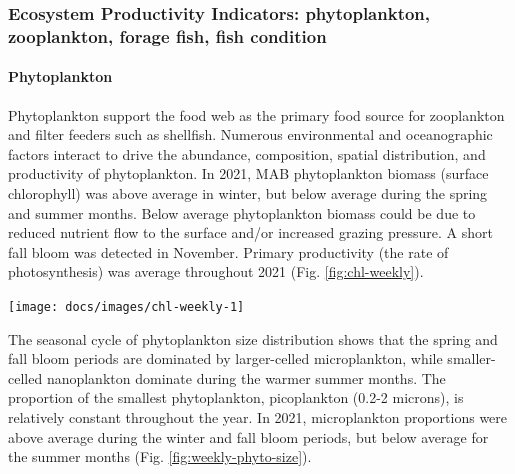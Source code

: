\documentclass[
  10pt,
]{article}
\let\origfigure\figure
\let\endorigfigure\endfigure
\renewenvironment{figure}[1][2] {
    \expandafter\origfigure\expandafter[H]
} {
    \endorigfigure
}
\begin{document}
\hypertarget{ecosystem-productivity-indicators-phytoplankton-zooplankton-forage-fish-fish-condition}{%
\subsubsection{Ecosystem Productivity Indicators: phytoplankton,
zooplankton, forage fish, fish
condition}\label{ecosystem-productivity-indicators-phytoplankton-zooplankton-forage-fish-fish-condition}}

\hypertarget{phytoplankton}{%
\paragraph{Phytoplankton}\label{phytoplankton}}

Phytoplankton support the food web as the primary food source for
zooplankton and filter feeders such as shellfish. Numerous environmental
and oceanographic factors interact to drive the abundance, composition,
spatial distribution, and productivity of phytoplankton. In 2021, MAB
phytoplankton biomass (surface chlorophyll) was above average in winter,
but below average during the spring and summer months. Below average
phytoplankton biomass could be due to reduced nutrient flow to the
surface and/or increased grazing pressure. A short fall bloom was
detected in November. Primary productivity (the rate of photosynthesis)
was average throughout 2021 (Fig. \ref{fig:chl-weekly}).

\begin{figure}

{\centering \texttt{[image: docs/images/chl-weekly-1]} 

}

\caption{Weekly chlorophyll concentrations and primary productivity in the Mid-Atlantic are shown by the colored line for 2021 (dashed portion indicates preliminary data from a new satellite source). The long-term mean is shown in black and shading indicates +/- 1 sample SD.}\label{fig:chl-weekly}
\end{figure}

The seasonal cycle of phytoplankton size distribution shows that the
spring and fall bloom periods are dominated by larger-celled
microplankton, while smaller-celled nanoplankton dominate during the
warmer summer months. The proportion of the smallest phytoplankton,
picoplankton (0.2-2 microns), is relatively constant throughout the
year. In 2021, microplankton proportions were above average during the
winter and fall bloom periods, but below average for the summer months
(Fig. \ref{fig:weekly-phyto-size}).
\end{document}
